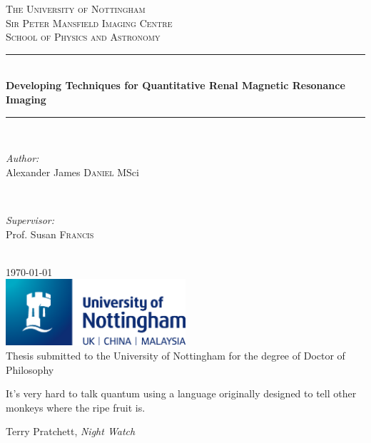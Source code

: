 \documentclass[12pt,a4paper,oneside]{report}
\author{Alexander James Daniel}
\newcommand\blankpage{
    \null
    \thispagestyle{empty}
    \addtocounter{page}{-1}
    \newpage}
\begin{document}
{
\begin{titlepage}
\newcommand{\HRule}{\rule{\linewidth}{0.5mm}}
\center
 
\textsc{\LARGE The University of Nottingham}\\[0.5cm]
\textsc{\Large Sir Peter Mansfield Imaging Centre}\\[0.5cm]
\textsc{\large School of Physics and Astronomy}\\[0.5cm]

\HRule \\[0.4cm]
{ \Large \bfseries Developing Techniques for Quantitative Renal Magnetic Resonance Imaging}\\[0.2cm]
\HRule \\[1.5cm]

\begin{minipage}{0.4\textwidth}
\begin{flushleft} \large
\emph{Author:}\\
Alexander James \textsc{Daniel} MSci
\end{flushleft}
\end{minipage}
~
\begin{minipage}{0.4\textwidth}
\begin{flushright} \large
\emph{Supervisor:} \\
Prof. Susan \textsc{Francis}
\end{flushright}
\end{minipage}\\[4cm]
{\large \today}\\[2cm]

\includegraphics[width=0.5\textwidth]{UoN_Primary_Logo_CMYK.eps}\\[1cm]
Thesis submitted to the University of Nottingham for the degree of Doctor of Philosophy
\vfill
\end{titlepage}
}
\pagestyle{plain}

\vspace*{200px}

\epigraph{\large{It’s very hard to talk quantum using a language originally designed to tell other monkeys where the ripe fruit is.}}{\normalsize{Terry Pratchett, \textit{Night Watch}}}
\newpage
\end{document}
